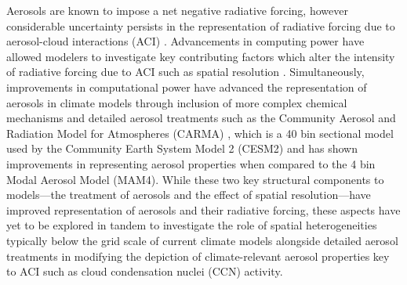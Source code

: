 \documentclass[journal abbreviation, manuscript]{copernicus}
\begin{document}
Aerosols are known to impose a net negative radiative forcing, however considerable uncertainty persists in the representation of radiative forcing due to aerosol-cloud interactions (ACI) \citep{ipcc_report_2021}. Advancements in computing power have allowed modelers to investigate key contributing factors which alter the intensity of radiative forcing due to ACI such as spatial resolution \citep{ma_how_2015}. Simultaneously, improvements in computational power have advanced the representation of aerosols in climate models through inclusion of more complex chemical mechanisms \citep{zaveri_development_2021} and detailed aerosol treatments such as the Community Aerosol and Radiation Model for Atmospheres (CARMA) , which is a 40 bin sectional model used by the Community Earth System Model 2 (CESM2) \citep{tilmes_description_2023} and has shown improvements in representing aerosol properties when compared to the 4 bin Modal Aerosol Model (MAM4). While these two key structural components to models---the treatment of aerosols and the effect of spatial resolution---have improved representation of aerosols and their radiative forcing, these aspects have yet to be explored in tandem to investigate the role of spatial heterogeneities typically below the grid scale of current climate models alongside detailed aerosol treatments in modifying the depiction of climate-relevant aerosol properties key to ACI such as cloud condensation nuclei (CCN) activity.

\end{document}
